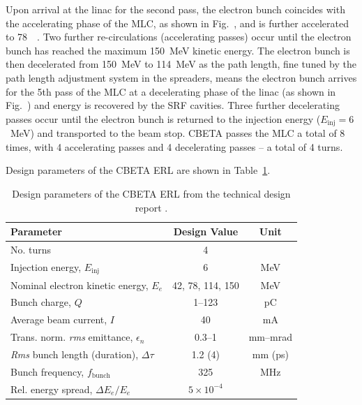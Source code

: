 \documentclass[../main.tex]{subfiles}
\begin{document}
Upon arrival at the linac for the second pass, the electron bunch coincides with the accelerating phase of the MLC, as shown in Fig.~, and is further accelerated to 78~\si{\mega\electronvolts}. Two further re-circulations (accelerating passes) occur until the electron bunch has reached the maximum 150~\si{\mega\electronvolt} kinetic energy. The electron bunch is then decelerated from 150~\si{\mega\electronvolt} to 114~\si{\mega\electronvolt} as the path length, fine tuned by the path length adjustment system in the spreaders, means the electron bunch arrives for the 5th pass of the MLC at a decelerating phase of the linac (as shown in Fig.~) and energy is recovered by the SRF cavities. Three further decelerating passes occur until the electron bunch is returned to the injection energy ($E_{\mathrm{inj}} = 6$~\si{\mega\electronvolt}) and transported to the beam stop. CBETA passes the MLC a total of 8 times, with 4 accelerating passes and 4 decelerating passes -- a total of 4 turns.

Design parameters of the CBETA ERL \cite{hoffstaetter2017cbeta} are shown in Table~\ref{tab:CBETA_ERL_design_parameters}.

\begin{table}[!h]
\centering
\caption{Design parameters of the CBETA ERL from the technical design report \cite{hoffstaetter2017cbeta}.}
\vspace{3mm}
\begin{tabular}{lcc}
\hline\hline
Parameter & Design Value & Unit \\
\hline
No. turns & 4 & \\
Injection energy, $E_{\mathrm{inj}}$ & 6 & \si{\mega\electronvolt} \\
Nominal electron kinetic energy, $E_{e}$ & 42, 78, 114, 150 & \si{\mega\electronvolt} \\
Bunch charge, $Q$ & 1--123 & \si{\pico\coulomb} \\
Average beam current, $I$ & 40 & \si{\milli\ampere} \\
Trans. norm. \textit{rms} emittance, $\epsilon_{n}$ & 0.3--1 & \si{\milli\meter}--\si{\milli\radian} \\
\textit{Rms} bunch length (duration), $\Delta\tau$ & 1.2 (4) & \si{\milli\meter} (\si{\pico\second}) \\
Bunch frequency, $f_{\mathrm{bunch}}$ & 325 & \si{\mega\hertz} \\
Rel. energy spread, $\Delta E_{e}/E_{e}$ & $5\times 10^{-4}$ & \\
\hline
\end{tabular}
\label{tab:CBETA_ERL_design_parameters}
\end{table}
\end{document}
